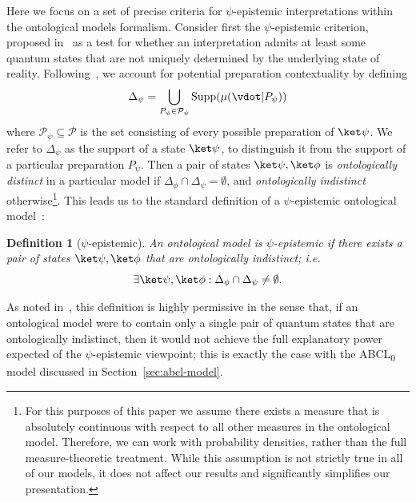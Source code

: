 \documentclass[%
 reprint,
superscriptaddress,
nofootinbib,
 amsmath,amssymb,
 prx, 
 accepted=2019-09-27,
]{quantumarticle}
\newtheorem{definition}{Definition}
\newcommand{\supp}{\textup{Supp}}
\newcommand{\abclz}{{ABCL\textsubscript{0}} }
\begin{document}
Here we focus on a set of precise criteria for $\psi$-epistemic
interpretations within the ontological models formalism. Consider
first the $\psi$-epistemic criterion, proposed
in~\cite{HarriganEinsteinincompletenessepistemic2010} as a test for
whether an interpretation admits at least some quantum states that are
not uniquely determined by the underlying state of
reality. Following~\cite{KaranjaiContextualityboundsefficiency2018},
we account for potential preparation contextuality by defining
\begin{equation}
  \label{eq:36}
  \Delta_\psi =\bigcup_{P_\psi\in\mathcal P_\psi}\supp(\mu(\vdot|P_\psi))
\end{equation}
where $\mathcal P_\psi\subseteq \mathcal P$ is the set consisting of
every possible preparation of $\ket\psi$. We refer to $\Delta_\psi$ as
the support of a state $\ket\psi$, to distinguish it from the support
of a particular preparation $P_\psi$. Then a pair of states
$\ket\psi,\ket\phi$ is \emph{ontologically distinct} in a particular
model if $\Delta_\phi\cap\Delta_\psi=\emptyset$, and
\emph{ontologically indistinct} otherwise\footnote{For this purposes
  of this paper we assume there exists a measure that is absolutely
  continuous with respect to all other measures in the ontological
  model. Therefore, we can work with probability densities, rather
  than the full measure-theoretic treatment. While this assumption is
  not strictly true in all of our models, it does not affect our
  results and significantly simplifies our presentation.}. This leads
us to the standard definition of a $\psi$-epistemic ontological
model~\cite{HarriganEinsteinincompletenessepistemic2010,Leiferquantumstatereal2014}:
\begin{definition}[$\psi$-epistemic]
  \label{def:psi-epistemic}
  An ontological model is $\psi$-epistemic if there exists a pair of
  states $\ket\psi,\ket\phi$ that are ontologically indistinct;
  i.e.
  \begin{equation}
  \exists \ket\psi,\ket\phi:\Delta_\phi\cap\Delta_\psi\neq\emptyset.
\end{equation}

\end{definition}
As noted in~\cite{Leiferquantumstatereal2014}, this definition is
highly permissive in the sense that, if an ontological model were to
contain only a single pair of quantum states that are ontologically
indistinct, then it would not achieve the full explanatory power
expected of the $\psi$-epistemic viewpoint; this is exactly the case
with the \abclz model discussed in Section~\ref{sec:abcl-model}.
\end{document}

